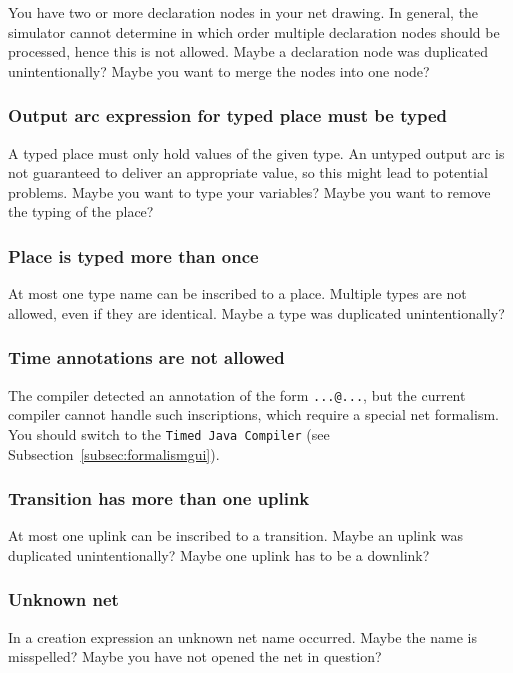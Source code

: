 You have two or more declaration nodes in your net drawing.
In general, the simulator cannot determine in which
order multiple declaration nodes should be processed,
hence this is not allowed.
Maybe a declaration node was duplicated unintentionally?
Maybe you want to merge the nodes into one node?

\subsubsection{Output arc expression for typed place must be typed}

A typed place must only hold values of the given type.
An untyped output arc is not guaranteed to deliver an
appropriate value, so this might lead to potential problems.
Maybe you want to type your variables? Maybe you
want to remove the typing of the place?

\subsubsection{Place is typed more than once}

At most one type name can be inscribed to a place.
Multiple types are not allowed, even if they are identical.
Maybe a type was duplicated unintentionally?

\subsubsection{Time annotations are not allowed}

The compiler detected an annotation of the form
\texttt{...@...}, but the current compiler cannot handle
such inscriptions, which require a special net formalism.
You should switch to the \texttt{Timed Java Compiler} (see
Subsection~\ref{subsec:formalismgui}).

\subsubsection{Transition has more than one uplink}

At most one uplink can be inscribed to a transition.
Maybe an uplink was duplicated unintentionally?
Maybe one uplink has to be a downlink?

\subsubsection{Unknown net}

In a creation expression an unknown net name occurred.
Maybe the name is misspelled? Maybe you have not opened the
net in question?

